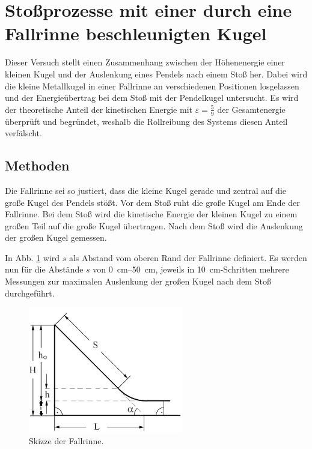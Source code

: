 \section{Stoßprozesse mit einer durch eine Fallrinne beschleunigten Kugel}
Dieser Versuch stellt einen Zusammenhang zwischen der Höhenenergie einer kleinen Kugel und der Auslenkung eines Pendels nach einem Stoß her.
Dabei wird die kleine Metallkugel in einer Fallrinne an verschiedenen Positionen losgelassen und der Energieübertrag bei dem Stoß mit der Pendelkugel untersucht.
Es wird der theoretische Anteil der kinetischen Energie mit $\varepsilon = \frac{5}{9}$ der Gesamtenergie überprüft und begründet, weshalb die Rollreibung des Systems diesen Anteil verfälscht.

	\subsection{Methoden}
	Die Fallrinne sei so justiert, dass die kleine Kugel gerade und zentral auf die große Kugel des Pendels stößt.
	Vor dem Stoß ruht die große Kugel am Ende der Fallrinne.
	Bei dem Stoß wird die kinetische Energie der kleinen Kugel zu einem großen Teil auf die große Kugel übertragen.
	Nach dem Stoß wird die Auslenkung der großen Kugel gemessen.
	
	In Abb. \ref{fig:fallrinneSkizze} wird $s$ als Abstand vom oberen Rand der Fallrinne definiert.
	Es werden nun für die Abstände $s$ von \SIrange{0}{50}{\centi\meter}, jeweils in \SI{10}{\centi\meter}-Schritten mehrere Messungen zur maximalen Auslenkung der großen Kugel nach dem Stoß durchgeführt.
	
	\begin{figure}[ht]
		\centering
		\includegraphics[width=0.6\textwidth]{FallrinneSkizze.png}
		\caption{Skizze der Fallrinne.}
		\label{fig:fallrinneSkizze}	
	\end{figure}

